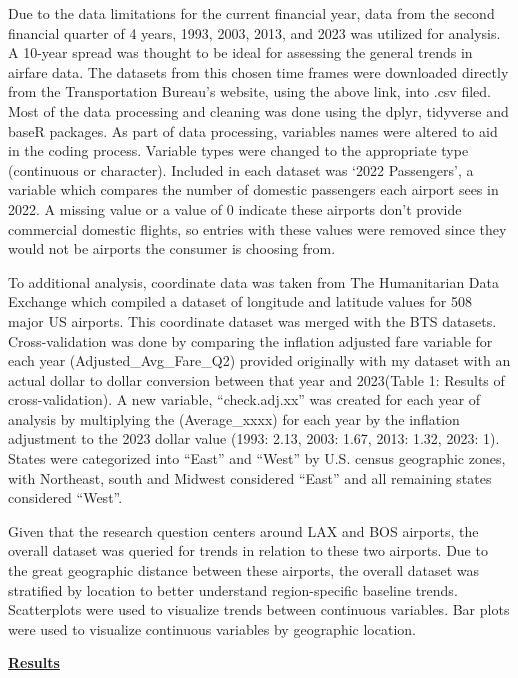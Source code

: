 \documentclass[
  letterpaper,
  DIV=11,
  numbers=noendperiod]{scrartcl}
\begin{document}
Due to the data limitations for the current financial year, data from
the second financial quarter of 4 years, 1993, 2003, 2013, and 2023 was
utilized for analysis. A 10-year spread was thought to be ideal for
assessing the general trends in airfare data. The datasets from this
chosen time frames were downloaded directly from the Transportation
Bureau's website, using the above link, into .csv filed. Most of the
data processing and cleaning was done using the dplyr, tidyverse and
baseR packages. As part of data processing, variables names were altered
to aid in the coding process. Variable types were changed to the
appropriate type (continuous or character). Included in each dataset was
`2022 Passengers', a variable which compares the number of domestic
passengers each airport sees in 2022. A missing value or a value of 0
indicate these airports don't provide commercial domestic flights, so
entries with these values were removed since they would not be airports
the consumer is choosing from.

To additional analysis, coordinate data was taken from The Humanitarian
Data Exchange which compiled a dataset of longitude and latitude values
for 508 major US airports. This coordinate dataset was merged with the
BTS datasets. Cross-validation was done by comparing the inflation
adjusted fare variable for each year (Adjusted\_Avg\_Fare\_Q2) provided
originally with my dataset with an actual dollar to dollar conversion
between that year and 2023(Table 1: Results of cross-validation). A new
variable, ``check.adj.xx'' was created for each year of analysis by
multiplying the (Average\_xxxx) for each year by the inflation
adjustment to the 2023 dollar value (1993: 2.13, 2003: 1.67, 2013: 1.32,
2023: 1). States were categorized into ``East'' and ``West'' by U.S.
census geographic zones, with Northeast, south and Midwest considered
``East'' and all remaining states considered ``West''.

Given that the research question centers around LAX and BOS airports,
the overall dataset was queried for trends in relation to these two
airports. Due to the great geographic distance between these airports,
the overall dataset was stratified by location to better understand
region-specific baseline trends. Scatterplots were used to visualize
trends between continuous variables. Bar plots were used to visualize
continuous variables by geographic location.

\ul{\textbf{Results}}
\end{document}
